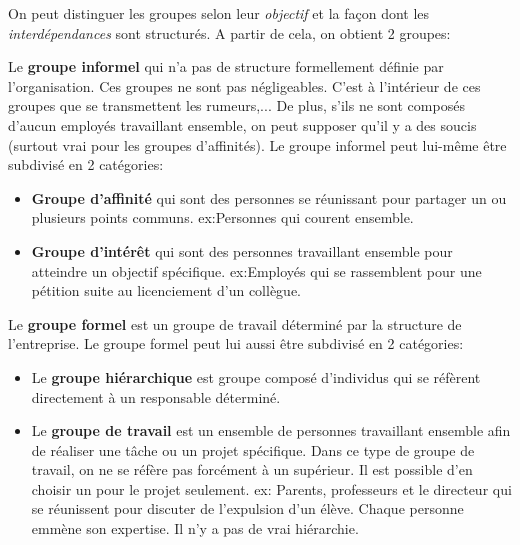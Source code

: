 \documentclass[12pt]{article}
\begin{document}
		On peut distinguer les groupes selon leur \textit{objectif} et la façon dont les \textit{interdépendances} sont structurés.	A partir de cela, on obtient 2 groupes: \newline
		
		Le \textbf{groupe informel} qui n'a pas de structure formellement définie par l'organisation. Ces groupes ne sont pas négligeables. C'est à l'intérieur de ces groupes que se transmettent les rumeurs,... De plus, s'ils ne sont composés d'aucun employés travaillant ensemble, on peut supposer qu'il y a des soucis (surtout vrai pour les groupes d'affinités). Le groupe informel peut lui-même être subdivisé en 2 catégories:
		\begin{itemize}
		\item \textbf{Groupe d'affinité} qui sont des personnes se réunissant pour partager un ou plusieurs points communs.\newline 
		ex:Personnes qui courent ensemble.
		\item \textbf{Groupe d'intérêt} qui sont des personnes travaillant ensemble pour atteindre un objectif spécifique.\newline 
		ex:Employés qui se rassemblent pour une pétition suite au licenciement d'un collègue. \newline
		\end{itemize}
		
		Le \textbf{groupe formel} est un groupe de travail déterminé par la structure de l'entreprise. Le groupe formel peut lui aussi être subdivisé en 2 catégories:
		\begin{itemize}
		\item Le \textbf{groupe hiérarchique} est groupe composé d'individus qui se réfèrent directement à un responsable déterminé.
		\item Le \textbf{groupe de travail} est un ensemble de personnes travaillant ensemble afin de réaliser une tâche ou un projet spécifique. Dans ce type de groupe de travail, on ne se réfère pas forcément à un supérieur. Il est possible d'en choisir un pour le projet seulement.\newline
		ex: Parents, professeurs et le directeur qui se réunissent pour discuter de l'expulsion d'un élève. Chaque personne emmène son expertise. Il n'y a pas de vrai hiérarchie. \newline
		\end{itemize}
		
\end{document}
